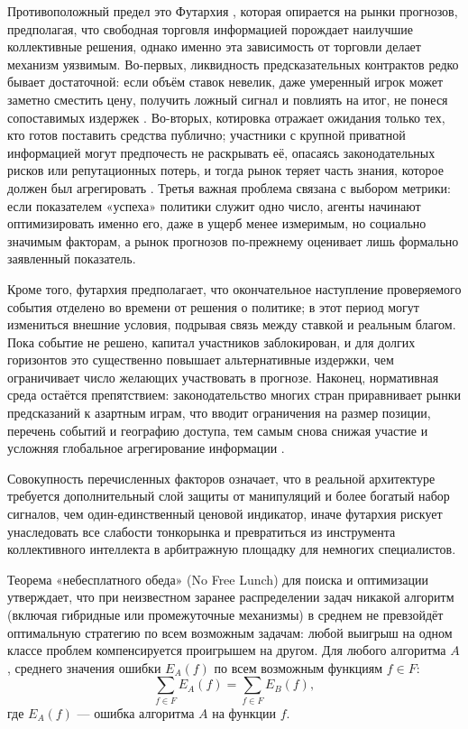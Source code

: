 \documentclass[
    14pt,
    specialist,
    candidate, %
    subf, %
    href,
    dotsinheaders=false
]{disser}
\begin{document}
Противоположный предел это Футархия \cite{Hanson2000}, которая опирается на рынки прогнозов, предполагая, что свободная торговля информацией порождает наилучшие коллективные решения, однако именно эта зависимость от торговли делает механизм уязвимым. Во-первых, ликвидность предсказательных контрактов редко бывает достаточной: если объём ставок невелик, даже умеренный игрок может заметно сместить цену, получить ложный сигнал и повлиять на итог, не понеся сопоставимых издержек \cite{Othman2013}. Во-вторых, котировка отражает ожидания только тех, кто готов поставить средства публично; участники с крупной приватной информацией могут предпочесть не раскрывать её, опасаясь законодательных рисков или репутационных потерь, и тогда рынок теряет часть знания, которое должен был агрегировать \cite{Pennock2011}. Третья важная проблема связана с выбором метрики: если показателем «успеха» политики служит одно число, агенты начинают оптимизировать именно его, даже в ущерб менее измеримым, но социально значимым факторам, а рынок прогнозов по-прежнему оценивает лишь формально заявленный показатель.

Кроме того, футархия предполагает, что окончательное наступление проверяемого события отделено во времени от решения о политике; в этот период могут измениться внешние условия, подрывая связь между ставкой и реальным благом. Пока событие не решено, капитал участников заблокирован, и для долгих горизонтов это существенно повышает альтернативные издержки, чем ограничивает число желающих участвовать в прогнозе. Наконец, нормативная среда остаётся препятствием: законодательство многих стран приравнивает рынки предсказаний к азартным играм, что вводит ограничения на размер позиции, перечень событий и географию доступа, тем самым снова снижая участие и усложняя глобальное агрегирование информации \cite{Buterin2025}.

Совокупность перечисленных факторов означает, что в реальной архитектуре требуется дополнительный слой защиты от манипуляций и более богатый набор сигналов, чем один-единственный ценовой индикатор, иначе футархия рискует унаследовать все слабости тонкорынка и превратиться из инструмента коллективного интеллекта в арбитражную площадку для немногих специалистов.

Теорема «небесплатного обеда» (No Free Lunch) для поиска и оптимизации утверждает, что при неизвестном заранее распределении задач никакой алгоритм (включая гибридные или промежуточные механизмы) в среднем не превзойдёт оптимальную стратегию по всем возможным задачам: любой выигрыш на одном классе проблем компенсируется проигрышем на другом.
Для любого алгоритма $A$, среднего значения ошибки $E_A(f)$ по всем возможным функциям $f \in F$:
\begin{equation}
  \sum_{f \in F} E_A(f) = \sum_{f \in F} E_B(f),
\end{equation}
где $E_A(f)$ — ошибка алгоритма $A$ на функции $f$.
\end{document}
